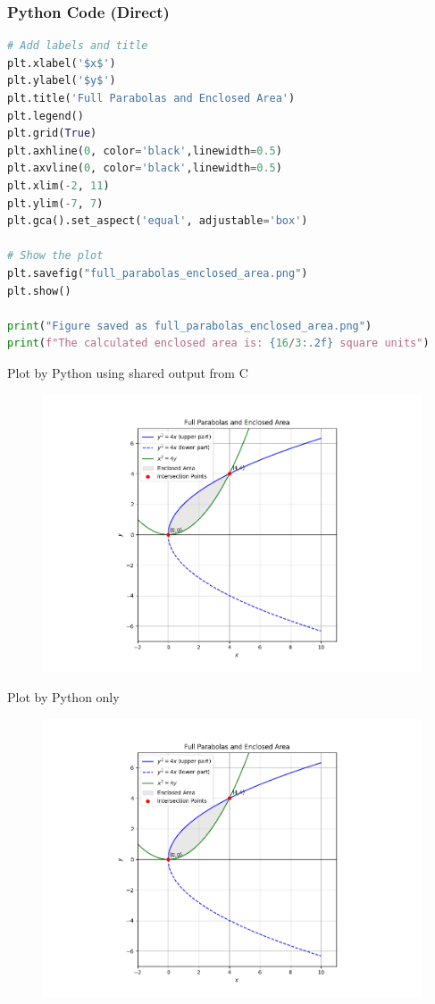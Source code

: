 \documentclass{beamer}
\begin{document}
\begin{frame}[fragile]
\frametitle{Python Code (Direct)}
\begin{lstlisting}[language=Python]
# Add labels and title
plt.xlabel('$x$')
plt.ylabel('$y$')
plt.title('Full Parabolas and Enclosed Area')
plt.legend()
plt.grid(True)
plt.axhline(0, color='black',linewidth=0.5)
plt.axvline(0, color='black',linewidth=0.5)
plt.xlim(-2, 11) 
plt.ylim(-7, 7)  
plt.gca().set_aspect('equal', adjustable='box')

# Show the plot
plt.savefig("full_parabolas_enclosed_area.png")
plt.show()

print("Figure saved as full_parabolas_enclosed_area.png")
print(f"The calculated enclosed area is: {16/3:.2f} square units")
\end{lstlisting}
\end{frame}

\begin{frame}{Plot by Python using shared output from C}
\begin{figure}[H]
\centering
\includegraphics[width=0.8\columnwidth]{../figs/fig1.png}
\caption{}
\label{fig:1}
\end{figure}
\end{frame}

\begin{frame}{Plot by Python only}
\begin{figure}[H]
\centering
\includegraphics[width=0.8\columnwidth]{../figs/fig2.png}
\caption{}
\label{fig:2}
\end{figure}
\end{frame}
\end{document}
